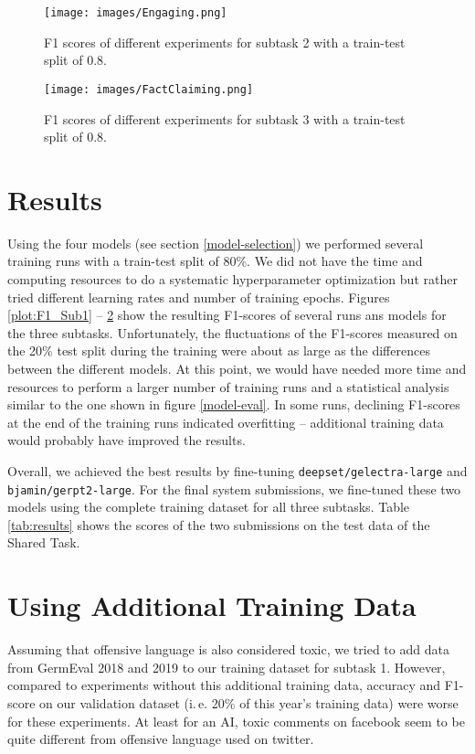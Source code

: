 \documentclass[11pt,a4paper]{article}
\begin{document}
\begin{figure}[h]
  \texttt{[image: images/Engaging.png]}
  \caption{\label{plot:F1_Sub2}F1 scores of different experiments for subtask 2 with a train-test split of 0.8.}
\end{figure}

\begin{figure}[h]
  \texttt{[image: images/FactClaiming.png]}
  \caption{\label{plot:F1_Sub3}F1 scores of different experiments for subtask 3 with a train-test split of 0.8.}
\end{figure}

\section{Results}
Using the four models (see section \ref{model-selection}) we performed several training runs with a train-test split of 80\%.
We did not have the time and computing resources to do a systematic hyperparameter optimization but rather tried different 
learning rates and number of training epochs. 
Figures \ref{plot:F1_Sub1} -- \ref{plot:F1_Sub3} show the resulting F1-scores of several runs ans models for the three subtasks.
Unfortunately, the fluctuations of the F1-scores measured on the 20\% test split during the training were about as large as 
the differences between the different models. At this point, we would have needed more time and resources to perform a larger 
number of training runs and a statistical analysis similar to the one shown in figure \ref{model-eval}. 
In some runs, declining F1-scores at the end of the training runs indicated overfitting -- additional training data would 
probably have improved the results.

Overall, we achieved the best results by fine-tuning \texttt{deepset/gelectra-large} and \texttt{bjamin/gerpt2-large}.
For the final system submissions, we fine-tuned these two models using the complete training dataset for all three subtasks.
Table \ref{tab:results} shows the scores of the two submissions on the test data of the Shared Task.


\section{Using Additional Training Data}
Assuming that offensive language is also considered toxic,
we tried to add data from GermEval 2018 and 2019 to our training dataset for subtask 1.
However, compared to experiments without this additional training data, accuracy and F1-score on our 
validation dataset (i.\,e. 20\% of this year's training data)
were worse for these experiments. 
At least for an AI, toxic comments on facebook seem to be quite different from offensive language 
used on twitter. 
\end{document}
